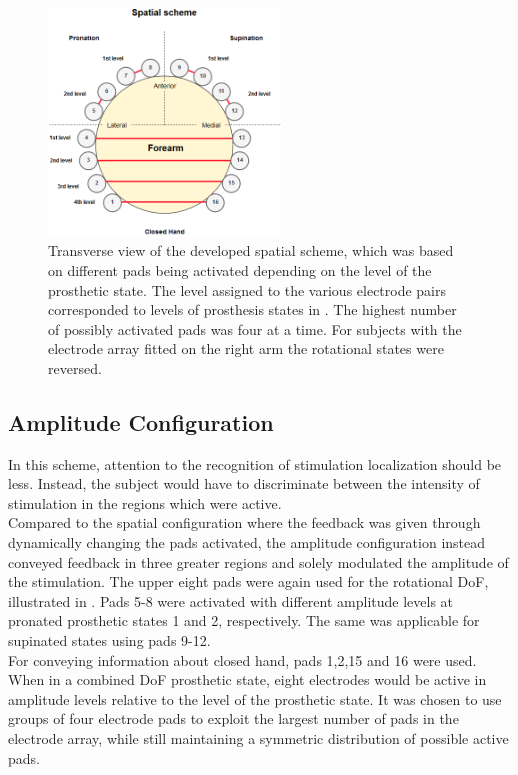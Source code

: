 \begin{figure}[H]                 
	\includegraphics[width=0.55\textwidth]{figures/El_array_spatial}  
	\caption{Transverse view of the developed spatial scheme, which was based on different pads being activated depending on the level of the prosthetic state. The level assigned to the various electrode pairs corresponded to levels of prosthesis states in . The highest number of possibly activated pads was four at a time. For subjects with the electrode array fitted on the right arm the rotational states were reversed.}
	\label{fig:spatial} 
\end{figure}


\subsection{Amplitude Configuration}

In this scheme, attention to the recognition of stimulation localization should be less. Instead, the subject would have to discriminate between the intensity of stimulation in the regions which were active. \\
Compared to the spatial configuration where the feedback was given through dynamically changing the pads activated, the amplitude configuration instead conveyed feedback in three greater regions and solely modulated the amplitude of the stimulation. The upper eight pads were again used for the rotational DoF, illustrated in . Pads 5-8 were activated with different amplitude levels at pronated prosthetic states 1 and 2, respectively. The same was applicable for supinated states using pads 9-12. \\
For conveying information about closed hand, pads 1,2,15 and 16 were used. When in a combined DoF prosthetic state, eight electrodes would be active in amplitude levels relative to the level of the prosthetic state. It was chosen to use groups of four electrode pads to exploit the largest number of pads in the electrode array, while still maintaining a symmetric distribution of possible active pads.

